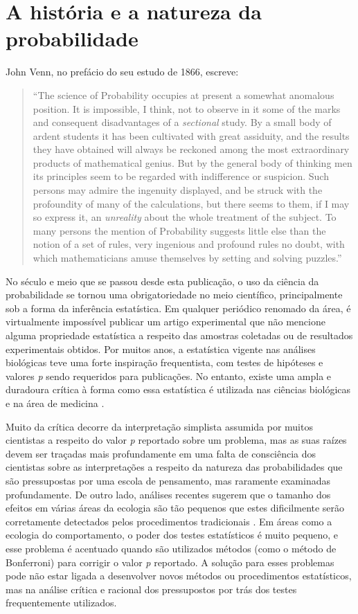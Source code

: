 \section{A história e a natureza da probabilidade}

John Venn, no prefácio do seu estudo de 1866, escreve:

\begin{quote}
``The science of Probability occupies at present a somewhat anomalous position. It is impossible, I think, not to observe
in it some of the marks and consequent disadvantages of a {\em sectional} study. By a small body of ardent students it
has been cultivated with great assiduity, and the results they have obtained will always be reckoned among the most 
extraordinary products of mathematical genius. But by the general body of thinking men its principles seem to be regarded
with indifference or suspicion. Such persons may admire the ingenuity displayed, and be struck with the profoundity
of many of the calculations, but there seems to them, if I may so express it, an {\em unreality} about the whole treatment
of the subject. To many persons the mention of Probability suggests little else than the notion of a set of rules, very
ingenious and profound rules no doubt, with which mathematicians amuse themselves by setting and solving puzzles.''
\citep{Venn1866}
\end{quote}

No século e meio que se passou desde esta publicação, o uso da ciência da probabilidade
se tornou uma obrigatoriedade no meio científico, principalmente sob a forma da inferência estatística.
Em qualquer periódico renomado da área, é virtualmente impossível publicar um artigo experimental que não 
mencione alguma propriedade
estatística a respeito das amostras coletadas ou de resultados experimentais obtidos. 
Por muitos anos, a estatística vigente nas análises biológicas teve uma
forte inspiração frequentista, com testes de hipóteses e valores {\em p} sendo requeridos para publicações. 
No entanto, existe uma ampla e duradoura crítica à forma como essa estatística é
utilizada nas ciências biológicas e na área de medicina \citep{Ioannidis05, Burnham11, Barber14, Gardner86}.

Muito da crítica decorre da interpretação
simplista assumida por muitos cientistas a respeito do valor {\em p} reportado sobre um problema, mas as suas raízes devem
ser traçadas mais profundamente em uma falta de consciência dos cientistas sobre as interpretações a respeito da natureza
das probabilidades que são pressupostas por uma escola de pensamento, mas raramente examinadas profundamente. 
De outro lado, análises recentes sugerem que o tamanho dos efeitos em várias áreas da ecologia são tão pequenos que estes
dificilmente serão corretamente detectados pelos procedimentos tradicionais \citep{Jennions03}. Em áreas como a ecologia do
comportamento, o poder dos testes estatísticos é muito pequeno, e esse problema é acentuado quando são utilizados métodos
(como o método de Bonferroni) para corrigir o valor {\em p} reportado. A solução para esses problemas pode não estar ligada
a desenvolver novos métodos ou procedimentos estatísticos, mas na análise crítica e racional dos pressupostos por trás
dos testes frequentemente utilizados.

